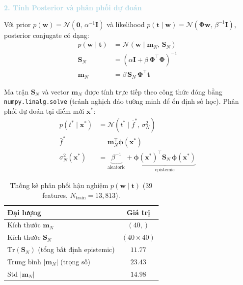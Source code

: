 \vspace{0.5em}
\noindent\textcolor{lightblue}{\textbf{2. Tính Posterior và phân phối dự đoán}}
\vspace{0.5em}

Với prior $p(\mathbf{w}) = \mathcal{N}(\mathbf{0},\, \alpha^{-1}\mathbf{I})$
và likelihood $p(\mathbf{t} \mid \mathbf{w}) = \mathcal{N}(\boldsymbol{\Phi}\mathbf{w},\, \beta^{-1}\mathbf{I})$,
posterior conjugate có dạng:
\begin{align*}
    p(\mathbf{w} \mid \mathbf{t}) &= \mathcal{N}(\mathbf{w} \mid \mathbf{m}_N,\, \mathbf{S}_N) \\
    \mathbf{S}_N &= \left(\alpha\mathbf{I} + \beta\,\boldsymbol{\Phi}^\top\boldsymbol{\Phi}\right)^{-1} \\
    \mathbf{m}_N &= \beta\,\mathbf{S}_N\,\boldsymbol{\Phi}^\top\mathbf{t}
\end{align*}

Ma trận $\mathbf{S}_N$ và vector $\mathbf{m}_N$ được tính trực tiếp theo
công thức đóng bằng \texttt{numpy.linalg.solve} (tránh nghịch đảo tường
minh để ổn định số học). Phân phối dự đoán tại điểm mới $\mathbf{x}^*$:
\begin{align*}
    p(t^* \mid \mathbf{x}^*) &= \mathcal{N}(t^* \mid \bar{f}^*,\, \sigma_N^2) \\
    \bar{f}^* &= \mathbf{m}_N^\top\boldsymbol{\phi}(\mathbf{x}^*) \\
    \sigma_N^2(\mathbf{x}^*) &= \underbrace{\beta^{-1}}_{\text{aleatoric}}
                               + \underbrace{\boldsymbol{\phi}(\mathbf{x}^*)^\top
                               \mathbf{S}_N\,\boldsymbol{\phi}(\mathbf{x}^*)}_{\text{epistemic}}
\end{align*}

\begin{table}[H]
\centering
\caption{Thống kê phân phối hậu nghiệm $p(\mathbf{w} \mid \mathbf{t})$
         (39 features, $N_{\text{train}} = 13{,}813$).}
\label{tab:posterior_stats}
\renewcommand{\arraystretch}{1.3}
\begin{tabular}{lc}
\toprule
\textbf{Đại lượng} & \textbf{Giá trị} \\
\midrule
Kích thước $\mathbf{m}_N$ & $(40,)$ \\
Kích thước $\mathbf{S}_N$ & $(40 \times 40)$ \\
$\mathrm{Tr}(\mathbf{S}_N)$ (tổng bất định epistemic) & $11.77$ \\
Trung bình $|\mathbf{m}_N|$ (trọng số) & $23.43$ \\
Std $|\mathbf{m}_N|$ & $14.98$ \\
\bottomrule
\end{tabular}
\end{table}

